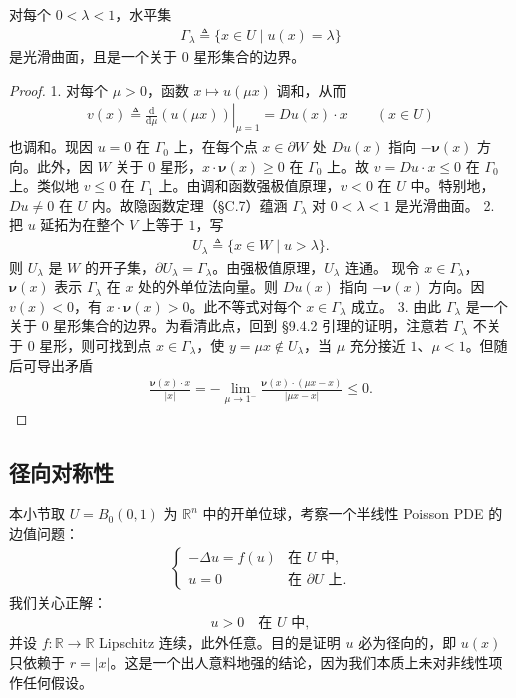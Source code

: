 \documentclass[../../main.tex]{subfiles}
\begin{document}
\begin{theorem}[星形水平集]\label{theorem:ch09-5-1-星形水平集}
对每个 $0<\lambda<1$，水平集
\begin{align*}
\Gamma_\lambda\triangleq\{x\in U\mid u(x)=\lambda\}
\end{align*}
是光滑曲面，且是一个关于 $0$ 星形集合的边界。
\begin{proof}
1. 对每个 $\mu>0$，函数 $x\mapsto u(\mu x)$ 调和，从而
\begin{align*}
v(x)\triangleq\left.\frac{\mathrm{d}}{\mathrm{d}\mu}(u(\mu x))\right|_{\mu=1}=Du(x)\cdot x\qquad (x\in U)
\end{align*}
也调和。现因 $u=0$ 在 $\Gamma_0$ 上，在每个点 $x\in\partial W$ 处 $Du(x)$ 指向 $-\boldsymbol{\nu}(x)$ 方向。此外，因 $W$ 关于 $0$ 星形，$x\cdot\boldsymbol{\nu}(x)\geqslant 0$ 在 $\Gamma_0$ 上。故 $v=Du\cdot x\leqslant 0$ 在 $\Gamma_0$ 上。类似地 $v\leqslant 0$ 在 $\Gamma_1$ 上。由调和函数强极值原理，$v<0$ 在 $U$ 中。特别地，$Du\neq 0$ 在 $U$ 内。故隐函数定理（\S C.7）蕴涵 $\Gamma_\lambda$ 对 $0<\lambda<1$ 是光滑曲面。
2. 把 $u$ 延拓为在整个 $V$ 上等于 $1$，写
\begin{align*}
U_\lambda\triangleq\{x\in W\mid u>\lambda\}.
\end{align*}
则 $U_\lambda$ 是 $W$ 的开子集，$\partial U_\lambda=\Gamma_\lambda$。由强极值原理，$U_\lambda$ 连通。
现令 $x\in\Gamma_\lambda$，$\boldsymbol{\nu}(x)$ 表示 $\Gamma_\lambda$ 在 $x$ 处的外单位法向量。则 $Du(x)$ 指向 $-\boldsymbol{\nu}(x)$ 方向。因 $v(x)<0$，有 $x\cdot\boldsymbol{\nu}(x)>0$。此不等式对每个 $x\in\Gamma_\lambda$ 成立。
3. 由此 $\Gamma_\lambda$ 是一个关于 $0$ 星形集合的边界。为看清此点，回到 \S9.4.2 引理的证明，注意若 $\Gamma_\lambda$ 不关于 $0$ 星形，则可找到点 $x\in\Gamma_\lambda$，使 $y=\mu x\notin U_\lambda$，当 $\mu$ 充分接近 $1$、$\mu<1$。但随后可导出矛盾
\begin{align*}
\frac{\boldsymbol{\nu}(x)\cdot x}{|x|}=-\lim_{\mu\to 1^-}\frac{\boldsymbol{\nu}(x)\cdot(\mu x-x)}{|\mu x-x|}\leqslant 0.
\end{align*}
\end{proof}
\end{theorem}

\subsection{径向对称性}\label{subsection:ch09-5-2-径向对称}

本小节取 $U=B_0(0,1)$ 为 $\mathbb{R}^n$ 中的开单位球，考察一个半线性 Poisson PDE 的边值问题：
\begin{align}
\begin{cases}
-\Delta u=f(u)&\text{在 }U\text{ 中},\\
u=0&\text{在 }\partial U\text{ 上}.
\end{cases}\label{align:ch09-5-eq02}
\end{align}
我们关心正解：
\begin{align}
u>0\quad\text{在 }U\text{ 中},\label{align:ch09-5-eq03}
\end{align}
并设 $f:\mathbb{R}\to\mathbb{R}$ Lipschitz 连续，此外任意。目的是证明 $u$ 必为径向的，即 $u(x)$ 只依赖于 $r=|x|$。这是一个出人意料地强的结论，因为我们本质上未对非线性项作任何假设。
\end{document}
